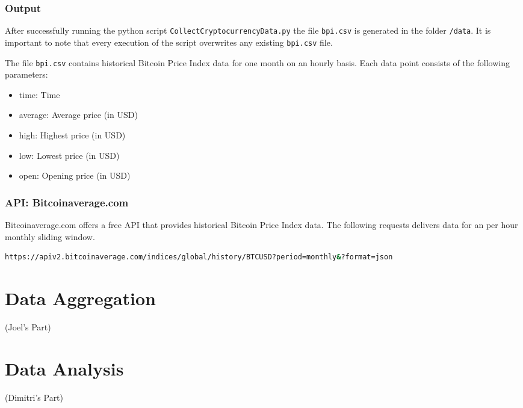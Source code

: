 \documentclass[a4paper,12pt]{article}
\begin{document}
\begin{spacing}{1.2}
\subsubsection{Output}
After successfully running the python script \verb|CollectCryptocurrencyData.py| the file \verb|bpi.csv| is generated in the folder \verb|/data|. It is important to note that every execution of the script overwrites any existing \verb|bpi.csv| file.

The file \verb|bpi.csv| contains historical Bitcoin Price Index data for one month on an hourly basis. Each data point consists of the following parameters:
\begin{itemize}
    \item time: Time
    \item average: Average price (in USD)
    \item high: Highest price (in USD)
    \item low: Lowest price (in USD)
    \item open: Opening price (in USD)
\end{itemize}

\subsubsection{API: Bitcoinaverage.com}
Bitcoinaverage.com offers a free API that provides historical Bitcoin Price Index data. The following requests delivers data for an per hour monthly sliding window.
\begin{lstlisting}[language=bash]
https://apiv2.bitcoinaverage.com/indices/global/history/BTCUSD?period=monthly&?format=json
\end{lstlisting}

\section{Data Aggregation}
(Joel's Part)
\section{Data Analysis}
(Dimitri's Part)


\end{spacing}
\clearpage

\printbibliography
\end{document}
